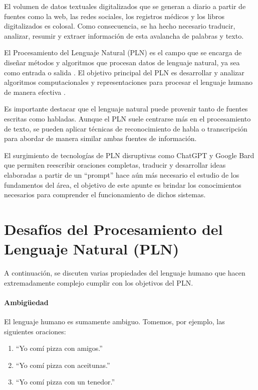 El volumen de datos textuales digitalizados que se generan a diario a partir de fuentes como la web, las redes sociales, los registros médicos y los libros digitalizados es colosal. Como consecuencia, se ha hecho necesario traducir, analizar, resumir y extraer información de esta avalancha de palabras y texto.

El Procesamiento del Lenguaje Natural (PLN) es el campo que se encarga de diseñar métodos y algoritmos que procesan datos de lenguaje natural, ya sea como entrada o salida \cite{goldberg2017neural}. El objetivo principal del PLN es desarrollar y analizar algoritmos computacionales y representaciones para procesar el lenguaje humano de manera efectiva \cite{jacobbook}.

Es importante destacar que el lenguaje natural puede provenir tanto de fuentes escritas como habladas. Aunque el PLN suele centrarse más en el procesamiento de texto, se pueden aplicar técnicas de reconocimiento de habla o transcripción para abordar de manera similar ambas fuentes de información.

El surgimiento de tecnologías de PLN disruptivas como ChatGPT y Google Bard que permiten reescribir oraciones completas, traducir y desarrollar ideas elaboradas a partir de un ``prompt'' hace aún más necesario el estudio de los fundamentos del área, el objetivo de este apunte es brindar los conocimientos necesarios para comprender el funcionamiento de dichos sistemas.

\section{Desafíos del Procesamiento del Lenguaje Natural (PLN)}

A continuación, se discuten varias propiedades del lenguaje humano que hacen extremadamente complejo cumplir con los objetivos del PLN.

\paragraph{Ambigüedad}

El lenguaje humano es sumamente ambiguo. Tomemos, por ejemplo, las siguientes oraciones:

\begin{enumerate}
  \item ``Yo comí pizza con amigos.''
  \item ``Yo comí pizza con aceitunas.''
  \item ``Yo comí pizza con un tenedor.''
\end{enumerate}

